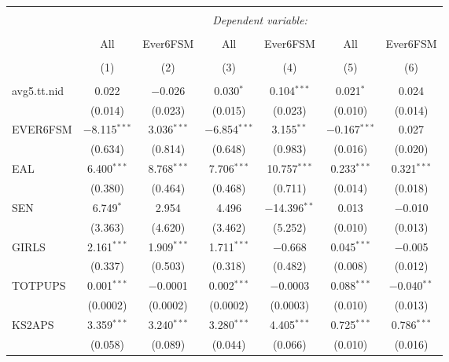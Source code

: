 \documentclass[11pt]{article}
\begin{document}
\begin{table}[!htbp] \centering 
  \caption{} 
  \label{} 
\begin{tabular}{@{\extracolsep{5pt}}lcccccc} 
\\[-1.8ex]\hline 
\hline \\[-1.8ex] 
 & \multicolumn{6}{c}{\textit{Dependent variable:}} \\ 
\cline{2-7} 
\\[-1.8ex] & All & Ever6FSM & All & Ever6FSM & All& Ever6FSM \\ 
\\[-1.8ex] & (1) & (2) & (3) & (4) & (5) & (6)\\ 
\hline \\[-1.8ex] 
 avg5.tt.nid & 0.022 & $-$0.026 & 0.030$^{*}$ & 0.104$^{***}$ & 0.021$^{*}$ & 0.024 \\ 
  & (0.014) & (0.023) & (0.015) & (0.023) & (0.010) & (0.014) \\ 
  EVER6FSM & $-$8.115$^{***}$ & 3.036$^{***}$ & $-$6.854$^{***}$ & 3.155$^{**}$ & $-$0.167$^{***}$ & 0.027 \\ 
  & (0.634) & (0.814) & (0.648) & (0.983) & (0.016) & (0.020) \\ 
  EAL & 6.400$^{***}$ & 8.768$^{***}$ & 7.706$^{***}$ & 10.757$^{***}$ & 0.233$^{***}$ & 0.321$^{***}$ \\ 
  & (0.380) & (0.464) & (0.468) & (0.711) & (0.014) & (0.018) \\ 
  SEN & 6.749$^{*}$ & 2.954 & 4.496 & $-$14.396$^{**}$ & 0.013 & $-$0.010 \\ 
  & (3.363) & (4.620) & (3.462) & (5.252) & (0.010) & (0.013) \\ 
  GIRLS & 2.161$^{***}$ & 1.909$^{***}$ & 1.711$^{***}$ & $-$0.668 & 0.045$^{***}$ & $-$0.005 \\  
  & (0.337) & (0.503) & (0.318) & (0.482) & (0.008) & (0.012) \\ 
  TOTPUPS & 0.001$^{***}$ & $-$0.0001 & 0.002$^{***}$ & $-$0.0003 & 0.088$^{***}$ & $-$0.040$^{**}$ \\ 
  & (0.0002) & (0.0002) & (0.0002) & (0.0003) & (0.010) & (0.013) \\ 
  KS2APS & 3.359$^{***}$ & 3.240$^{***}$ & 3.280$^{***}$ & 4.405$^{***}$ & 0.725$^{***}$ & 0.786$^{***}$ \\ 
  & (0.058) & (0.089) & (0.044) & (0.066) & (0.010) & (0.016) \\ 

\end{tabular}
\end{table}
\end{document}
